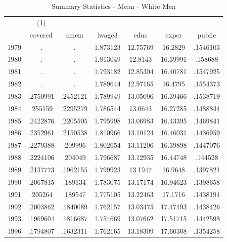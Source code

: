 {
\def\sym#1{\ifmmode^{#1}\else\(^{#1}\)\fi}
\begin{longtable}{l*{1}{cccccc}}
\caption{Summary Statistics - Mean - White Men}\\
\hline\hline\endfirsthead\hline\endhead\hline\endfoot\endlastfoot
            &\multicolumn{1}{c}{(1)}&            &            &            &            &            \\
            &     covered&        umem&      lwage3&        educ&       exper&      public\\
\hline
1979        &           .&           .&    1.873123&    12.75769&     16.2829&    .1546103\\
1980        &           .&           .&    1.813049&     12.8143&    16.39991&     .158688\\
1981        &           .&           .&    1.793182&    12.85304&    16.40781&    .1547925\\
1982        &           .&           .&    1.789644&    12.97165&     16.4795&    .1554373\\
1983        &    .2750991&    .2452121&    1.789949&    13.05096&    16.39466&    .1538719\\
1984        &     .255159&    .2295279&    1.786544&     13.0643&    16.27285&    .1488844\\
1985        &    .2422876&    .2205505&    1.795998&    13.06983&    16.43395&    .1469841\\
1986        &    .2352961&    .2150538&    1.810966&    13.10124&    16.46031&    .1436959\\
1987        &    .2279388&     .209996&    1.802654&    13.11206&    16.39898&    .1447076\\
1988        &    .2224106&     .204049&    1.796687&    13.12935&    16.44748&     .144528\\
1989        &    .2137773&    .1962155&    1.799923&     13.1947&     16.9648&    .1397821\\
1990        &    .2067815&     .189134&    1.783075&    13.17174&    16.94623&    .1398658\\
1991        &     .205264&     .189547&    1.775105&    13.22463&     17.1716&    .1438194\\
1992        &    .2003862&    .1840089&    1.762157&    13.03475&    17.47193&    .1438426\\
1993        &    .1969604&    .1816687&    1.754669&    13.07662&    17.51715&    .1442598\\
1996        &    .1794807&    .1632311&    1.762165&    13.18309&    17.60308&    .1354258\\

\end{longtable}}
